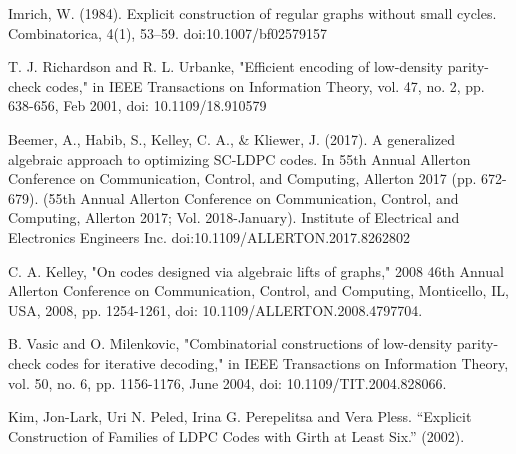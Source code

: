 \documentclass[a4paper,fleqn]{cas-sc}
\begin{document}
\begin{thebibliography}{0}
Imrich, W. (1984). Explicit construction of regular graphs without small cycles. Combinatorica, 4(1), 53–59. doi:10.1007/bf02579157 

T. J. Richardson and R. L. Urbanke, "Efficient encoding of low-density parity-check codes," in IEEE Transactions on Information Theory, vol. 47, no. 2, pp. 638-656, Feb 2001, doi: 10.1109/18.910579

Beemer, A., Habib, S., Kelley, C. A., & Kliewer, J. (2017). A generalized algebraic approach to optimizing SC-LDPC codes. In 55th Annual Allerton Conference on Communication, Control, and Computing, Allerton 2017 (pp. 672-679). (55th Annual Allerton Conference on Communication, Control, and Computing, Allerton 2017; Vol. 2018-January). Institute of Electrical and Electronics Engineers Inc. doi:10.1109/ALLERTON.2017.8262802


C. A. Kelley, "On codes designed via algebraic lifts of graphs," 2008 46th Annual Allerton Conference on Communication, Control, and Computing, Monticello, IL, USA, 2008, pp. 1254-1261, doi: 10.1109/ALLERTON.2008.4797704.


B. Vasic and O. Milenkovic, "Combinatorial constructions of low-density parity-check codes for iterative decoding," in IEEE Transactions on Information Theory, vol. 50, no. 6, pp. 1156-1176, June 2004, doi: 10.1109/TIT.2004.828066.

Kim, Jon-Lark, Uri N. Peled, Irina G. Perepelitsa and Vera Pless. “Explicit Construction of Families of LDPC Codes with Girth at Least Six.” (2002).









\end{thebibliography}
\end{document}
